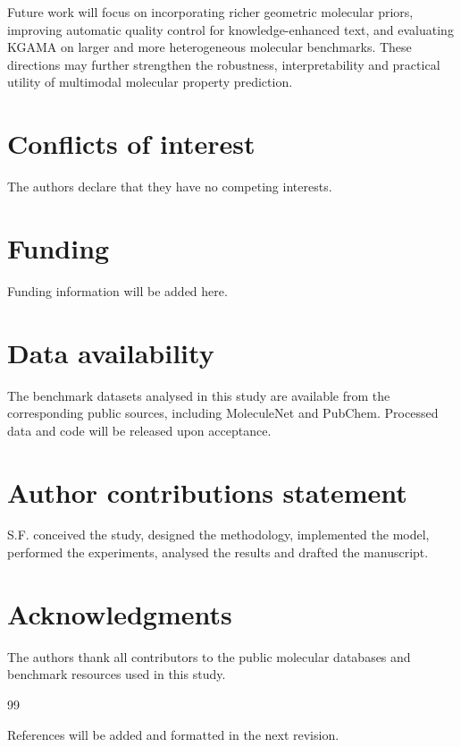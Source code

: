 \documentclass[webpdf,contemporary,large]{oup-authoring-template}%
\begin{document}
Future work will focus on incorporating richer geometric molecular priors, improving automatic quality control for knowledge-enhanced text, and evaluating KGAMA on larger and more heterogeneous molecular benchmarks. These directions may further strengthen the robustness, interpretability and practical utility of multimodal molecular property prediction.

\section{Conflicts of interest}
The authors declare that they have no competing interests.

\section{Funding}
Funding information will be added here.

\section{Data availability}
The benchmark datasets analysed in this study are available from the corresponding public sources, including MoleculeNet and PubChem. Processed data and code will be released upon acceptance.

\section{Author contributions statement}
S.F. conceived the study, designed the methodology, implemented the model, performed the experiments, analysed the results and drafted the manuscript.

\section{Acknowledgments}
The authors thank all contributors to the public molecular databases and benchmark resources used in this study.

\begin{thebibliography}{99}

References will be added and formatted in the next revision.

\end{thebibliography}
\end{document}
